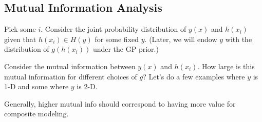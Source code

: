 \documentclass[11pt]{article}
\begin{document}
\subsection{Mutual Information Analysis}

Pick some $i$.  Consider the joint probability distribution of $y(x)$ and $h(x_i)$ given that $h(x_i) \in H(y)$ for some fixed $y$. (Later, we will endow $y$ with the distribution of $g(h(x_i))$ under the GP prior.)

Consider the mutual information between $y(x)$ and $h(x_i)$. How large is this mutual information for different choices of $g$?  Let's do a few examples where $y$ is 1-D and some where $y$ is 2-D.

Generally, higher mutual info should correspond to having more value for composite modeling.



\end{document}
